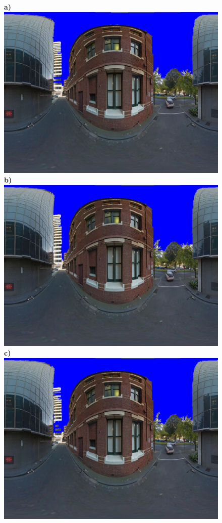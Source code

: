 \documentclass[final,3p,times,authoryear]{elsarticle}
\begin{document}
\begin{figure}
\textbf{a)}\includegraphics[scale=0.08]{Images/mean/0070_3_6_100_ms_sky_mark.png} 
\textbf{b)}\includegraphics[scale=0.08]{Images/mean/0070_7_6_100_ms_sky_mark.png} 
\textbf{c)}\includegraphics[scale=0.08]{Images/mean/0070_5_7_210_ms_sky_mark.png} 

\end{figure}
\end{document}
